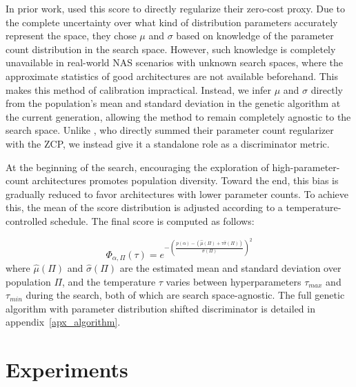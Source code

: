\documentclass[10pt]{article} %
\begin{document}
In prior work, \citet{peng2024swap} used this score to directly regularize their zero-cost proxy. Due to the complete uncertainty over what kind of distribution parameters accurately represent the space, they chose $\mu$ and $\sigma$ based on knowledge of the parameter count distribution in the search space. However, such knowledge is completely unavailable in real-world NAS scenarios with unknown search spaces, where the approximate statistics of good architectures are not available beforehand. This makes this method of calibration impractical. Instead, we infer $\mu$ and $\sigma$ directly from the population's mean and standard deviation in the genetic algorithm at the current generation, allowing the method to remain completely agnostic to the search space. Unlike \citet{peng2024swap}, who directly summed their parameter count regularizer with the ZCP, we instead give it a standalone role as a discriminator metric.

At the beginning of the search, encouraging the exploration of high-parameter-count architectures promotes population diversity. Toward the end, this bias is gradually reduced to favor architectures with lower parameter counts. To achieve this, the mean of the score distribution is adjusted according to a temperature-controlled schedule. The final score is computed as follows:

$$
\Phi_{\alpha, \Pi}(\tau) = e^{-\left(\frac{p(\alpha) - (\hat{\mu}(\Pi) + \tau\hat{\sigma}(\Pi))}{\hat{\sigma}(\Pi)}\right)^2}
$$
where $\hat{\mu}(\Pi)$ and $\hat{\sigma}(\Pi)$ are the estimated mean and standard deviation over population $\Pi$, and the temperature $\tau$ varies between hyperparameters $\tau_{max}$ and $\tau_{min}$ during the search, both of which are search space-agnostic. The full genetic algorithm with parameter distribution shifted discriminator is detailed in appendix~\ref{apx_algorithm}.

\section{Experiments}
\label{experiments}
\end{document}
